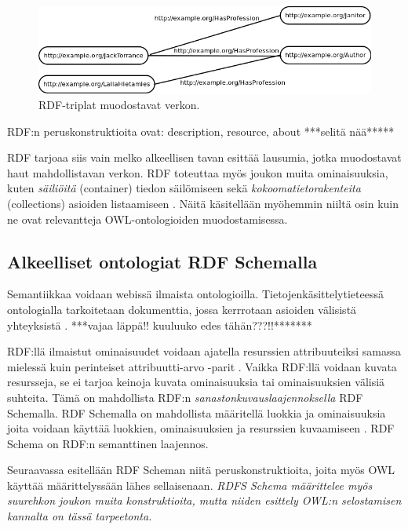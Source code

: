 \documentclass[finnish]{tktltiki2}
\theoremstyle{definition}
\theoremstyle{remark}
\begin{document}
\begin{figure}[h]
 \centering
 \includegraphics[scale=0.50]{torrance2.png}
 \caption{RDF-triplat muodostavat verkon.}
 \label{jack2}
\end{figure}

RDF:n peruskonstruktioita ovat: description, resource, about ***selitä nää*****

RDF tarjoaa siis vain melko alkeellisen tavan esittää lausumia, jotka
muodostavat haut mahdollistavan verkon. RDF toteuttaa myös joukon muita ominaisuuksia, kuten
\textit{säiliöitä} (container) tiedon säilömiseen sekä
\textit{kokoomatietorakenteita}
(collections) asioiden listaamiseen \cite{RDFP}. Näitä käsitellään myöhemmin
niiltä osin 
kuin ne ovat relevantteja OWL-ontologioiden muodostamisessa.  
 
\subsection{Alkeelliset ontologiat RDF Schemalla}
Semantiikkaa voidaan webissä ilmaista ontologioilla. Tietojenkäsittelytieteessä
ontologialla tarkoitetaan dokumenttia, jossa kerrrotaan asioiden välisistä
yhteyksistä \cite{BHL01}. ***vajaa läppä!! kuuluuko edes tähän???!!*******

RDF:llä ilmaistut ominaisuudet voidaan ajatella resurssien attribuuteiksi
samassa mielessä kuin perinteiset attribuutti-arvo -parit \cite{RDFS}. Vaikka 
RDF:llä voidaan kuvata resursseja, se ei tarjoa keinoja kuvata ominaisuuksia tai
ominaisuuksien välisiä suhteita. Tämä on mahdollista RDF:n \textit{sanastonkuvauslaajennoksella}
RDF Schemalla. RDF Schemalla on mahdollista määritellä luokkia ja ominaisuuksia
joita voidaan käyttää luokkien, ominaisuuksien ja resurssien kuvaamiseen \cite{RDFS}. 
RDF Schema on RDF:n semanttinen laajennos. 

Seuraavassa esitellään RDF Scheman niitä peruskonstruktioita, 
joita myös OWL käyttää määrittelyssään lähes sellaisenaan. \emph{RDFS Schema määrittelee myös suurehkon joukon muita konstruktioita, mutta niiden esittely OWL:n selostamisen kannalta on tässä tarpeetonta.} 
\end{document}

